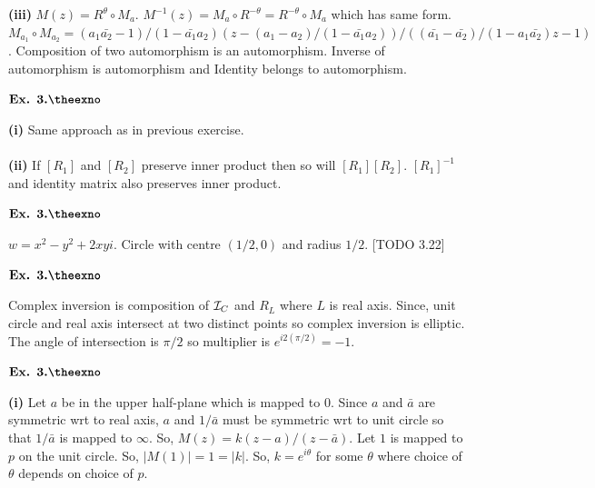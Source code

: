 \documentclass{article}
\def\tf{\textbf}
\def\mc{\ensuremath\mathcal}
\newcounter{exno}
\begin{document}
\tf{(iii)} $M(z) = R^{\theta} \circ M_a$. $M^{-1}(z) = M_a \circ R^{-\theta} = R^{-\theta} \circ M_a$ which has same form. $M_{a_1} \circ M_{a_2} = (a_1\bar{a_2}-1)/(1-\bar{a_1}a_2)(z-(a_1-a_2)/(1-\bar{a_1}a_2))/((\bar{a_1}-\bar{a_2})/(1-a_1\bar{a_2})z - 1)$. Composition of two automorphism is an automorphism. Inverse of automorphism is automorphism and Identity belongs to automorphism.

\vspace{0.2in}

${\textbf{Ex. 3.\theexno}}$
\addtocounter{exno}{1}

\tf{(i)} Same approach as in previous exercise.\\~\\

\tf{(ii)} If $[R_1]$ and $[R_2]$ preserve inner product then so will $[R_1][R_2]$. $[R_1]^{-1}$ and identity matrix also preserves inner product.

\vspace{0.2in}

${\textbf{Ex. 3.\theexno}}$
\addtocounter{exno}{1}

$w = x^2-y^2 + 2xyi$. Circle with centre $(1/2,0)$ and radius $1/2$. [TODO 3.22]

\vspace{0.2in}

${\textbf{Ex. 3.\theexno}}$
\addtocounter{exno}{1}

Complex inversion is composition of $\mc{I}_C$ and $R_{L}$ where $L$ is real axis. Since, unit circle and real axis intersect at two distinct points so complex inversion is elliptic. The angle of intersection is $\pi/2$ so multiplier is $e^{i2(\pi/2)} = -1$.

\vspace{0.2in}

${\textbf{Ex. 3.\theexno}}$
\addtocounter{exno}{1}

\tf{(i)} Let $a$ be in the upper half-plane which is mapped to $0$. Since $a$ and $\bar{a}$ are symmetric wrt to real axis, $a$ and $1/\bar{a}$ must be symmetric wrt to unit circle so that $1/\bar{a}$ is mapped to $\infty$. So, $M(z) = k(z-a)/(z-\bar{a})$. Let $1$ is mapped to $p$ on the unit circle. So, $|M(1)| = 1 = |k|$. So, $k = e^{i\theta}$ for some $\theta$ where choice of $\theta$ depends on choice of $p$.\\~\\
\end{document}
